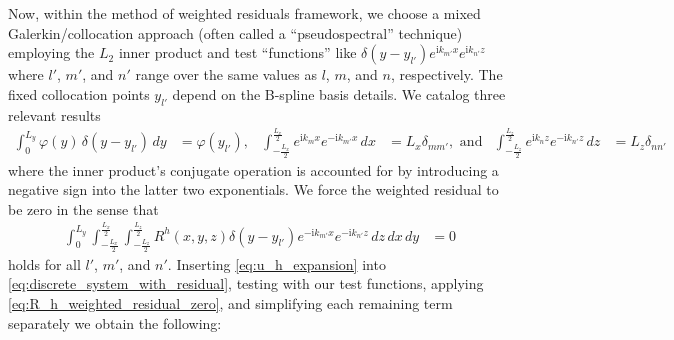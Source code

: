 \documentclass[letterpaper,11pt,nointlimits,reqno]{amsart}
\newcommand{\ii}{\ensuremath{\mathrm{i}}}
\begin{document}
Now, within the method of weighted residuals framework, we choose a mixed
Galerkin/collocation approach (often called a ``pseudospectral'' technique)
employing the $L_{2}$ inner product and test ``functions'' like
$\delta(y-y_{l'}) e^{\ii k_{m'} x}e^{\ii k_{n'} z}$ where $l'$, $m'$, and $n'$
range over the same values as $l$, $m$, and $n$, respectively.  The fixed
collocation points $y_{l'}$ depend on the B-spline basis details.  We catalog
three relevant results
\begin{align}
   \int_0^{L_y} \varphi(y) \, \delta(y-y_{l'}) \,d\!y
&= \varphi(y_{l'}),
&
   \int_{-\frac{L_x}{2}}^{\frac{L_x}{2}} e^{\ii k_m x} e^{-\ii k_{m'} x} \,d\!x
&= L_x \delta_{m m'}, \text{ and}
&
   \int_{-\frac{L_z}{2}}^{\frac{L_z}{2}} e^{\ii k_n z} e^{-\ii k_{n'} z} \,d\!z
&= L_z \delta_{n n'}
\end{align}
where the inner product's conjugate operation is accounted for by introducing a
negative sign into the latter two exponentials.  We force the weighted residual
to be zero in the sense that
\begin{align}
  \int_0^{L_y}
  \int_{-\frac{L_x}{2}}^{\frac{L_x}{2}}
  \int_{-\frac{L_z}{2}}^{\frac{L_z}{2}}
  R^h\!\left(x,y,z\right) \delta(y-y_{l'}) e^{-\ii k_{m'} x}e^{-\ii k_{n'} z}
  \,d\!z \,d\!x \,d\!y
  &=
  0
  \label{eq:R_h_weighted_residual_zero}
\end{align}
holds for all $l'$, $m'$, and $n'$.  Inserting \eqref{eq:u_h_expansion} into
\eqref{eq:discrete_system_with_residual}, testing with our test functions,
applying \eqref{eq:R_h_weighted_residual_zero}, and simplifying each remaining
term separately we obtain the following:
\end{document}
